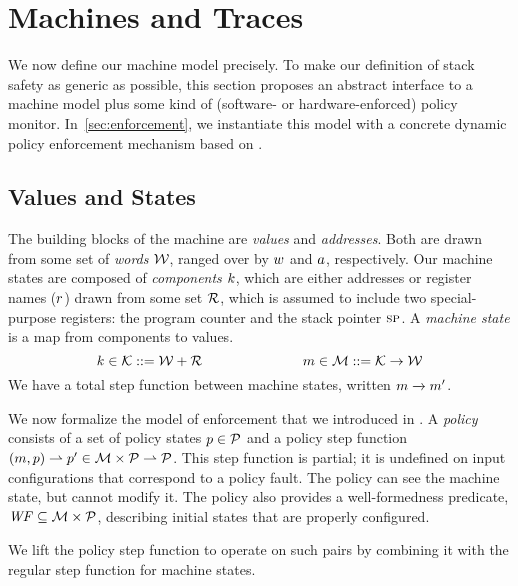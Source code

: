 \documentclass[acmsmall,review,anonymous]{acmart}\settopmatter{printfolios=true,printccs=false,printacmref=false}
\begin{document}
\section{Machines and Traces}
\label{sec:prelim}

We now define our machine model precisely. To make our definition of stack safety
as generic as possible, this section proposes an abstract interface to a
machine model plus some kind of (software- or hardware-enforced) policy monitor.
In~\cref{sec:enforcement}, we instantiate this model with a concrete dynamic
policy enforcement mechanism based on \citet{DBLP:conf/sp/RoesslerD18}.

\subsection{Values and States}

The building blocks of the machine are {\em values} and {\em addresses}.
Both are drawn from some set of {\em words} \({\mathcal W}\), ranged over by \(w\) and
\(a\), respectively.
%
Our machine states are composed of {\em components} \(k\),
which are either addresses or register names (\(r\)) drawn from some set
\({\mathcal R}\), which is assumed to include two special-purpose registers: the
program counter {\PCname} and the stack pointer \(\textsc{sp}\).
A {\em machine state} is a map from components to values.
%
    \[k \in {\mathcal K} ::= {\mathcal W} + {\mathcal R}  \hspace{1in}
    m \in {\mathcal M} ::= {\mathcal K} \rightarrow {\mathcal W}\]
%
We have a total step function between machine states, written \(m \xrightarrow{} m'\).

We now formalize the model of enforcement that we introduced in .
A {\em policy} consists of a set of policy
states \(p \in \mathcal{P}\) and a policy step function \((m, p) \rightharpoonup p' \in
{\mathcal M} \times \mathcal{P} \rightharpoonup \mathcal{P}\). This step function is partial;
it is undefined on input configurations that correspond to a policy fault. The policy
can see the machine state, but cannot modify it. The policy also provides a
well-formedness predicate, \(\mathit{WF} \subseteq {\mathcal M} \times \mathcal{P}\), describing
initial states that are properly configured.
%

We lift the policy step function to operate on such pairs
by combining it with the regular step function for machine states.
\end{document}

